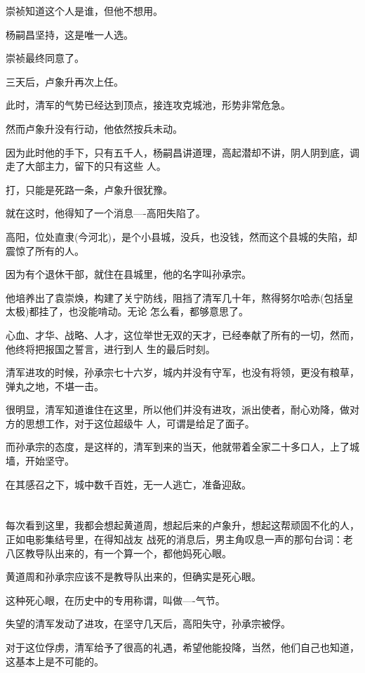 \documentclass[11pt,a4paper,onecolumn]{article}
\begin{document}
崇祯知道这个人是谁，但他不想用。

杨嗣昌坚持，这是唯一人选。

崇祯最终同意了。

三天后，卢象升再次上任。

此时，清军的气势已经达到顶点，接连攻克城池，形势非常危急。

然而卢象升没有行动，他依然按兵未动。

因为此时他的手下，只有五千人，杨嗣昌讲道理，高起潜却不讲，阴人阴到底，调走了大部主力，留下的只有这些
人。

打，只能是死路一条，卢象升很犹豫。

就在这时，他得知了一个消息----高阳失陷了。

高阳，位处直隶(今河北)，是个小县城，没兵，也没钱，然而这个县城的失陷，却震惊了所有的人。

因为有个退休干部，就住在县城里，他的名字叫孙承宗。

他培养出了袁崇焕，构建了关宁防线，阻挡了清军几十年，熬得努尔哈赤(包括皇太极)都挂了，也没能啃动。无论
怎么看，都够意思了。

心血、才华、战略、人才，这位举世无双的天才，已经奉献了所有的一切，然而，他终将把报国之誓言，进行到人
生的最后时刻。

清军进攻的时候，孙承宗七十六岁，城内并没有守军，也没有将领，更没有粮草，弹丸之地，不堪一击。

很明显，清军知道谁住在这里，所以他们并没有进攻，派出使者，耐心劝降，做对方的思想工作，对于这位超级牛
人，可谓是给足了面子。

而孙承宗的态度，是这样的，清军到来的当天，他就带着全家二十多口人，上了城墙，开始坚守。

在其感召之下，城中数千百姓，无一人逃亡，准备迎敌。

\section[\thesection]{}

每次看到这里，我都会想起黄道周，想起后来的卢象升，想起这帮顽固不化的人，正如电影集结号里，在得知战友
战死的消息后，男主角叹息一声的那句台词：老八区教导队出来的，有一个算一个，都他妈死心眼。

黄道周和孙承宗应该不是教导队出来的，但确实是死心眼。

这种死心眼，在历史中的专用称谓，叫做----气节。

失望的清军发动了进攻，在坚守几天后，高阳失守，孙承宗被俘。

对于这位俘虏，清军给予了很高的礼遇，希望他能投降，当然，他们自己也知道，这基本上是不可能的。
\end{document}

